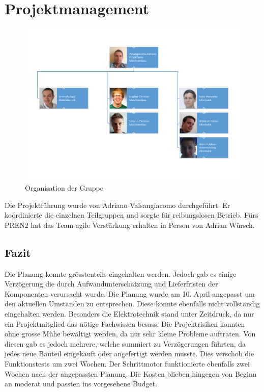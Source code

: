 \section{Projektmanagement}

\begin{figure}[h!]
	\centering
	\includegraphics[width=1.0\linewidth]{../../fig/Organigramm.pdf}
	\caption{Organisation der Gruppe}
	\label{fig:Organigramm}
\end{figure}

\noindent
Die Projektführung wurde von Adriano Valsangiacomo durchgeführt. Er
koordinierte die einzelnen Teilgruppen und sorgte für reibungslosen
Betrieb. Fürs PREN2 hat das Team agile Verstärkung erhalten in Person von Adrian Würsch.

\newpage

\newpage

\newpage


\newpage
\subsection{Fazit}

Die Planung konnte grösstenteils eingehalten werden. Jedoch gab es einige Verzögerung die durch Aufwandunterschätzung und Lieferfristen der Komponenten verursacht wurde. Die Planung wurde am 10. April angepasst um den aktuellen Umständen zu entsprechen. Diese konnte ebenfalls nicht vollständig eingehalten werden. Besonders die Elektrotechnik stand unter Zeitdruck, da nur ein Projektmitglied das nötige Fachwissen besass.
Die Projektrisiken konnten ohne grosse Mühe bewältigt werden, da nur sehr kleine Probleme auftraten.
Von diesen gab es jedoch mehrere, welche summiert zu Verzögerungen führten, da jedes neue Bauteil eingekauft oder angefertigt werden musste. Dies verschob die Funktionstests um zwei Wochen.
Der Schrittmotor funktionierte ebenfalls zwei Wochen nach der angepassten Planung.
Die Kosten blieben hingegen von Beginn an moderat und passten ins vorgesehene Budget.

